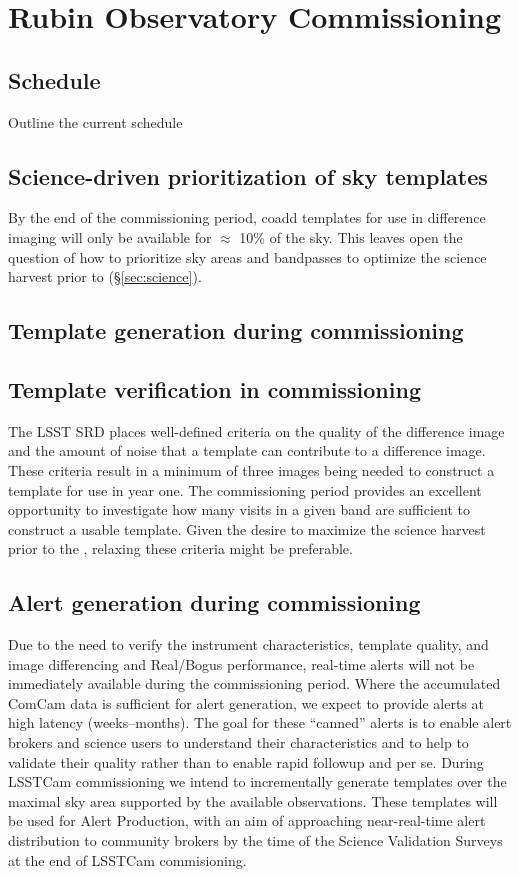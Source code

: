 \section{Rubin Observatory Commissioning} 
\label{sec:commissioning}

\subsection{Schedule}
Outline the current schedule 



\subsection{Science-driven prioritization of sky templates}
By the end of the commissioning period, coadd templates for use in difference imaging will only be available for $\approx$ 10\% of the sky. 
This leaves open the question of how to  prioritize  sky areas and bandpasses to optimize the science harvest prior to \drone (\S \ref{sec:science}).

\subsection{Template generation during commissioning}


\subsection{Template verification in commissioning}

The LSST SRD places well-defined criteria on the quality of the difference image and the amount of noise that a template can contribute to a difference image.  These criteria result in a minimum of three images being needed to construct a template for use in year one.  The commissioning period provides an excellent opportunity to investigate how many visits in a given band are sufficient to construct a usable template.  Given the desire to maximize the science harvest prior to the \drone,  relaxing these criteria might be preferable. 

\subsection{Alert generation during commissioning}

Due to the need to verify the instrument characteristics, template quality, and image differencing and Real/Bogus performance, real-time alerts will not be immediately available during the commissioning period. 
Where the accumulated ComCam data is sufficient for alert generation, we expect to provide alerts at high latency (weeks--months). 
The goal for these ``canned'' alerts is to enable alert brokers and science users to understand their characteristics and to help to validate their quality rather than to enable rapid followup and \es per se.
During LSSTCam commissioning we intend to incrementally generate templates over the maximal sky area supported by the available observations.
These templates will be used for Alert Production, with an aim of approaching near-real-time alert distribution to community brokers by the time of the Science Validation Surveys at the end of LSSTCam commisioning. 
